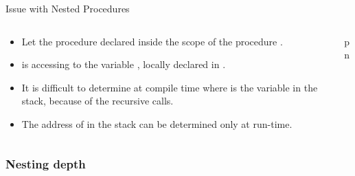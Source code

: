 \begin{bibunit}[apalike]
\begin{frame}{Issue with Nested Procedures}
	\begin{footnotesize}
	\vfill
	\begin{example}
		\begin{columns}
			\begin{column}[t]{.6\linewidth}
				\begin{itemize}
				\item Let the procedure  declared inside the scope of the procedure .
				\item {} is accessing to the variable , locally declared in .
				\item It is difficult to determine at compile time where is the variable  in the stack, because of the recursive calls.
				\item The address of  in the stack can be determined only at run-time.
				\end{itemize}
			\end{column}
			\begin{column}[t]{.4\linewidth}
				\begin{scriptsize}
				\begin{myprocedure}{p}{n}
				\end{myprocedure}
				\end{scriptsize}
			\end{column}
		\end{columns}
	\end{example}
	\end{footnotesize}
\end{frame}


\subsubsection{Nesting depth}

\tableofcontentslide[sections={1-4},sectionstyle={show/shaded},subsectionstyle={show/shaded/hide},subsubsectionstyle={show/shaded/hide/hide}]


\end{bibunit}
